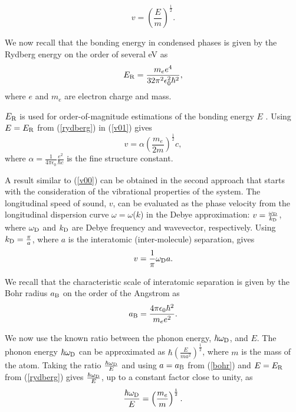 \documentclass[aps,prl,groupedaddress,fleqn,twocolumn,10pt]{revtex4-1}
\begin{document}
\begin{equation}
v=\left(\frac{E}{m}\right)^{\frac{1}{2}}.
\label{v01}
\end{equation}

We now recall that the bonding energy in condensed phases is given by the Rydberg energy on the order of several eV \cite{ashcroft} as
\begin{equation}
E_{\rm R}=\frac{m_ee^4}{32\pi^2\epsilon_0^2\hbar^2},
\label{rydberg}
\end{equation}
\noindent where $e$ and $m_e$ are electron charge and mass.

$E_{\rm R}$ is used for order-of-magnitude estimations of the bonding energy $E$ \cite{ashcroft}. Using $E=E_{\rm R}$ from (\ref{rydberg}) in (\ref{v01}) gives
\begin{equation}
v=\alpha\left(\frac{m_e}{2m}\right)^{\frac{1}{2}}c,
\label{v00}
\end{equation}
\noindent where $\alpha=\frac{1}{4\pi\epsilon_0}\frac{e^2}{\hbar c}$ is the fine structure constant.

A result similar to (\ref{v00}) can be obtained in the second approach that starts with the consideration of the vibrational properties of the system. The longitudinal speed of sound, $v$, can be evaluated as the phase velocity from the longitudinal dispersion curve $\omega=\omega$($k$) in the Debye approximation: $v=\frac{\omega_{\rm D}}{k_{\rm D}}$, where $\omega_{\rm D}$ and $k_{\rm D}$ are Debye frequency and wavevector, respectively. Using $k_{\rm D}=\frac{\pi}{a}$, where $a$ is the interatomic (inter-molecule) separation, gives
\begin{equation}
v=\frac{1}{\pi}\omega_{\rm D}a.
\label{v001}
\end{equation}

We recall that the characteristic scale of interatomic separation is given by the Bohr radius $a_{\rm B}$ on the order of the Angstrom as
\begin{equation}
a_{\rm B}=\frac{4\pi\epsilon_0\hbar^2}{m_e e^2}.
\label{bohr}
\end{equation}

We now use the known ratio between the phonon energy, $\hbar\omega_{\rm D}$, and $E$. The phonon energy $\hbar\omega_{\rm D}$ can be approximated as $\hbar\left(\frac{E}{ma^2}\right)^{\frac{1}{2}}$, where $m$ is the mass of the atom. Taking the ratio $\frac{\hbar\omega_{\rm D}}{E}$ and using $a=a_{\rm B}$ from (\ref{bohr}) and $E=E_{\rm R}$ from (\ref{rydberg}) gives $\frac{\hbar\omega_{\rm D}}{E}$, up to a constant factor close to unity, as
\begin{equation}
\frac{\hbar\omega_{\rm D}}{E}=\left(\frac{m_e}{m}\right)^{\frac{1}{2}}.
\label{ratio}
\end{equation}
\end{document}
